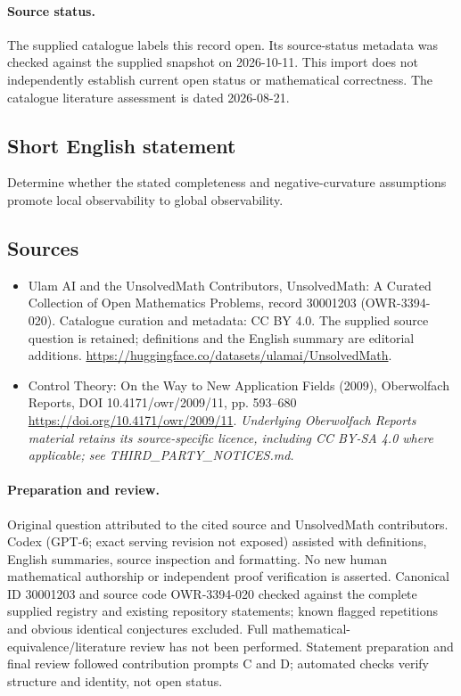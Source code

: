 \documentclass[11pt]{article}
\begin{document}
\paragraph{Source status.}
The supplied catalogue labels this record open. Its source-status metadata was checked against the supplied snapshot on 2026-10-11. This import does not independently establish current open status or mathematical correctness. The catalogue literature assessment is dated 2026-08-21.
\subsection{Short English statement}
Determine whether the stated completeness and negative-curvature assumptions promote local observability to global observability.
\subsection{Sources}
\begin{itemize}
\item[S1] Ulam AI and the UnsolvedMath Contributors, UnsolvedMath: A Curated Collection of Open Mathematics Problems, record 30001203 (OWR-3394-020). Catalogue curation and metadata: CC BY 4.0. The supplied source question is retained; definitions and the English summary are editorial additions.
\url{https://huggingface.co/datasets/ulamai/UnsolvedMath}.
\item[S2] Control Theory: On the Way to New Application Fields (2009), Oberwolfach Reports, DOI 10.4171/owr/2009/11, pp. 593--680
\url{https://doi.org/10.4171/owr/2009/11}.
\textit{Underlying Oberwolfach Reports material retains its source-specific licence, including CC BY-SA 4.0 where applicable; see THIRD\_PARTY\_NOTICES.md.}
\end{itemize}
\paragraph{Preparation and review.}
Original question attributed to the cited source and UnsolvedMath contributors. Codex (GPT-6; exact serving revision not exposed) assisted with definitions, English summaries, source inspection and formatting. No new human mathematical authorship or independent proof verification is asserted. Canonical ID 30001203 and source code OWR-3394-020 checked against the complete supplied registry and existing repository statements; known flagged repetitions and obvious identical conjectures excluded. Full mathematical-equivalence/literature review has not been performed. Statement preparation and final review followed contribution prompts C and D; automated checks verify structure and identity, not open status.
\label{end:30001203}
\end{document}
